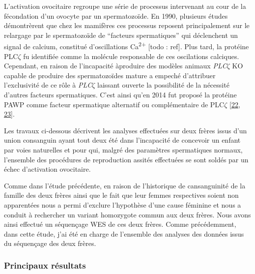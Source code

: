 \documentclass[12pt,twoside]{ugathesis}
\begin{document}
L'activation ovocitaire regroupe une série de processus intervenant au
cour de la fécondation d'un ovocyte par un spermatozoïde. En 1990,
plusieurs études démontrèrent que chez les mamifères ces processus
reposent principalement sur le relargage par le spermatozoïde de
``facteurs spermatiques'' qui déclenchent un signal de calcium,
constitué d'oscillations Ca\textsuperscript{2+} {[}todo : ref{]}. Plus
tard, la protéine PLC\(\zeta\) fu identifiée comme la molécule
responsable de ces oscilations calciques. Cependant, en raison de
l'incapacité àproduire des modèles animaux \emph{PLC}\(\zeta\) KO
capable de produire des spermatozoïdes mature a empeché d'attribuer
l'exclusivité de ce rôle à \emph{PLC}\(\zeta\) laissant ouverte la
possibilité de la nécessité d'autres facteurs spermatiques. C'est ainsi
qu'en 2014 fut proposé la protéine PAWP comme facteur spermatique
alternatif ou complémentaire de PLC\(\zeta\)
{[}\protect\hyperlink{ref-Aarabi2014}{22},
\protect\hyperlink{ref-Aarabi2014a}{23}{]}.

Les travaux ci-dessous décrivent les analyses effectuées sur deux frères
issus d'un union consanguin ayant tout deux été dans l'incapacité de
concevoir un enfant par voies naturelles et pour qui, malgré des
paramètres spermatiques normaux, l'ensemble des procédures de
reproduction assités effectuées se sont soldés par un échec d'activation
ovocitaire.

Comme dans l'étude précédente, en raison de l'historique de
cansanguinité de la famille des deux frères ainsi que le fait que leur
femmes respectives soient non apparentées nous a permi d'exclure
l'hypothèse d'une cause féminine et nous a conduit à rechercher un
variant homozygote commun aux deux frères. Nous avons ainsi effectué un
séquençage WES de ces deux frères. Comme précédemment, dans cette étude,
j'ai été en charge de l'ensemble des analyses des données issus du
séquençage des deux frères.

\newpage



\newpage

\subsubsection{Principaux résultats}\label{principaux-resultats-1}
\end{document}
